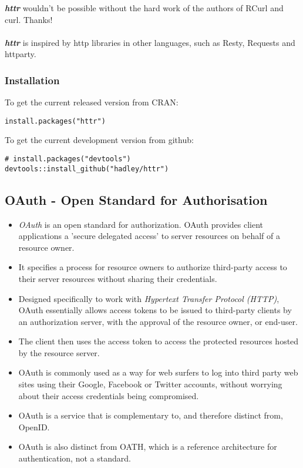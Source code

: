 \documentclass[12pt]{article}
\begin{document}
\noindent \textbf{\textit{httr}} wouldn't be possible without the hard work of the authors of RCurl and curl. Thanks! \\\\ \textbf{\textit{httr}} is inspired by http libraries in other languages, such as Resty, Requests and httparty.

\newpage
\subsubsection*{Installation}

To get the current released version from CRAN:
\begin{framed}
\begin{verbatim}
install.packages("httr")
\end{verbatim}
\end{framed}
To get the current development version from github:
\begin{framed}
\begin{verbatim}
# install.packages("devtools")
devtools::install_github("hadley/httr")
\end{verbatim}
\end{framed}
\newpage

\subsection*{OAuth - Open Standard for Authorisation}



\begin{itemize}
\item \textit{OAuth} is an open standard for authorization. OAuth provides client applications a 'secure delegated access' to server resources on behalf of a resource owner. 
\item It specifies a process for resource owners to authorize third-party access to their server resources without sharing their credentials. 
\item Designed specifically to work with \textit{Hypertext Transfer Protocol (HTTP)}, OAuth essentially allows access tokens to be issued to third-party clients by an authorization server, with the approval of the resource owner, or end-user.
\item The client then uses the access token to access the protected resources hosted by the resource server.
\item OAuth is commonly used as a way for web surfers to log into third party web sites using their Google, Facebook or Twitter accounts, without worrying about their access credentials being compromised.

\item OAuth is a service that is complementary to, and therefore distinct from, OpenID. 
\item OAuth is also distinct from OATH, which is a reference architecture for authentication, not a standard.
\end{itemize}
\end{document}
